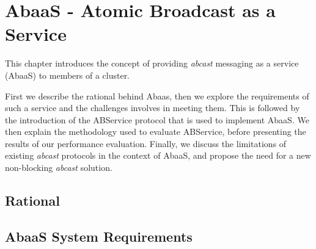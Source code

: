 \chapter{AbaaS - Atomic Broadcast as a Service}

\ifpdf
    \graphicspath{{Chapter3/Figs/Raster/}{Chapter3/Figs/PDF/}{Chapter3/Figs/}}
\else
    \graphicspath{{Chapter3/Figs/Vector/}{Chapter3/Figs/}}
\fi


This chapter introduces the concept of providing \emph{abcast} messaging as a service (\textsf{AbaaS}) to members of a cluster.

First we describe the rational behind \textsf{Abaas}, then we explore the requirements of such a service and the challenges involves in meeting them.  This is followed by the introduction of the \textsf{ABService} protocol that is used to implement \textsf{AbaaS}.  We then explain the methodology used to evaluate \textsf{ABService}, before presenting the results of our performance evaluation.  Finally, we discuss the limitations of existing \emph{abcast} protocols in the context of \textsf{AbaaS}, and propose the need for a new non-blocking \emph{abcast} solution.  

\section{Rational}

\section{AbaaS System Requirements}
		

